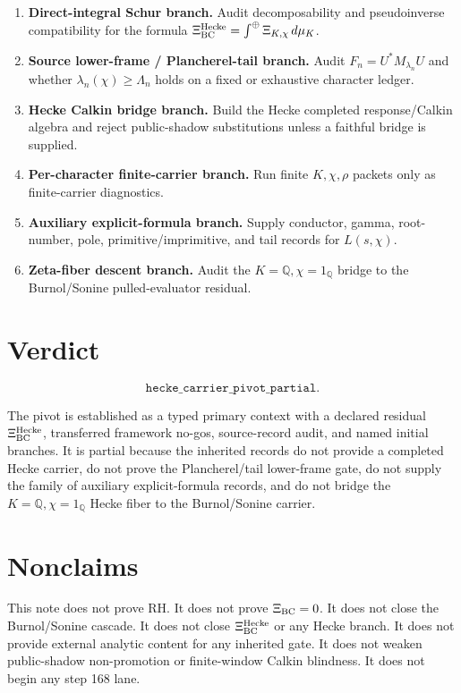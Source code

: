\documentclass[11pt]{article}
\newcommand{\Q}{\mathbb Q}
\newcommand{\XiH}{\Xi_{\rm BC}^{\rm Hecke}}
\newcommand{\XiBC}{\Xi_{\rm BC}}
\newcommand{\dd}{\,d}
\begin{document}
\begin{enumerate}[label=\textbf{H\arabic*.}]
\item \textbf{Direct-integral Schur branch.}  Audit decomposability and pseudoinverse compatibility for the formula \(\XiH=\int^\oplus\Xi_{K,\chi}\dd\mu_K\).
\item \textbf{Source lower-frame / Plancherel-tail branch.}  Audit \(F_n=U^*M_{\lambda_n}U\) and whether \(\lambda_n(\chi)\ge \Lambda_n\) holds on a fixed or exhaustive character ledger.
\item \textbf{Hecke Calkin bridge branch.}  Build the Hecke completed response/Calkin algebra and reject public-shadow substitutions unless a faithful bridge is supplied.
\item \textbf{Per-character finite-carrier branch.}  Run finite \(K,\chi,\rho\) packets only as finite-carrier diagnostics.
\item \textbf{Auxiliary explicit-formula branch.}  Supply conductor, gamma, root-number, pole, primitive/imprimitive, and tail records for \(L(s,\chi)\).
\item \textbf{Zeta-fiber descent branch.}  Audit the \(K=\Q,\chi=1_\Q\) bridge to the Burnol/Sonine pulled-evaluator residual.
\end{enumerate}

\section{Verdict}

\[
\boxed{\texttt{hecke\_carrier\_pivot\_partial}.}
\]

The pivot is established as a typed primary context with a declared residual \(\XiH\), transferred framework no-gos, source-record audit, and named initial branches.  It is partial because the inherited records do not provide a completed Hecke carrier, do not prove the Plancherel/tail lower-frame gate, do not supply the family of auxiliary explicit-formula records, and do not bridge the \(K=\Q,\chi=1_\Q\) Hecke fiber to the Burnol/Sonine carrier.

\section{Nonclaims}

This note does not prove RH.  It does not prove \(\XiBC=0\).  It does not close the Burnol/Sonine cascade.  It does not close \(\XiH\) or any Hecke branch.  It does not provide external analytic content for any inherited gate.  It does not weaken public-shadow non-promotion or finite-window Calkin blindness.  It does not begin any step 168 lane.
\end{document}
